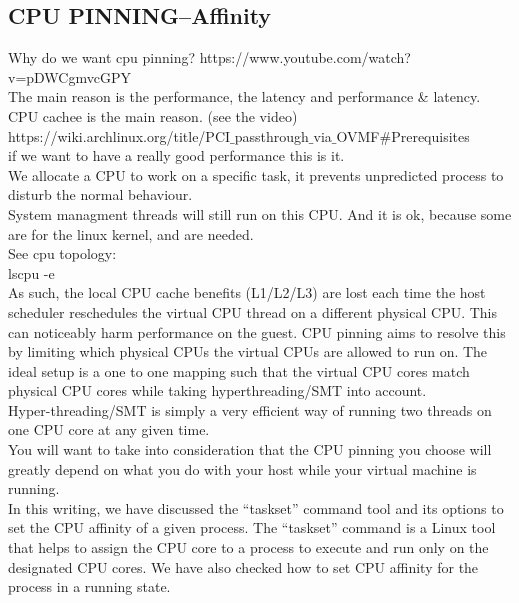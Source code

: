 \documentclass[11pt, a4paper, oneside]{article}
\theoremstyle{definition}
\begin{document}
\subsection{CPU PINNING--Affinity}
Why do we want cpu pinning? https://www.youtube.com/watch?v=pDWCgmvcGPY\\
The main reason is the performance, the latency and performance \& latency.\\
CPU cachee is the main reason. (see the video)\\


https://wiki.archlinux.org/title/PCI$\_$passthrough$\_$via$\_$OVMF$\#$Prerequisites\\

if we want to have a really good performance this is it.\\
We allocate a CPU to work on a specific task, it prevents unpredicted process to disturb the normal behaviour.\\
System managment threads will still run on this CPU. And it is ok, because some are for the linux kernel, and are needed.\\

See cpu topology:\\
lscpu -e\\

As such, the local CPU cache benefits (L1/L2/L3) are lost each time the host scheduler reschedules the virtual CPU thread on a different physical CPU. This can noticeably harm performance on the guest. CPU pinning aims to resolve this by limiting which physical CPUs the virtual CPUs are allowed to run on. The ideal setup is a one to one mapping such that the virtual CPU cores match physical CPU cores while taking hyperthreading/SMT into account. \\

Hyper-threading/SMT is simply a very efficient way of running two threads on one CPU core at any given time.\\
You will want to take into consideration that the CPU pinning you choose will greatly depend on what you do with your host while your virtual machine is running. \\

In this writing, we have discussed the “taskset” command tool and its options to set the CPU affinity of a given process. The “taskset” command is a Linux tool that helps to assign the CPU core to a process to execute and run only on the designated CPU cores. We have also checked how to set CPU affinity for the process in a running state.\\
\end{document}
